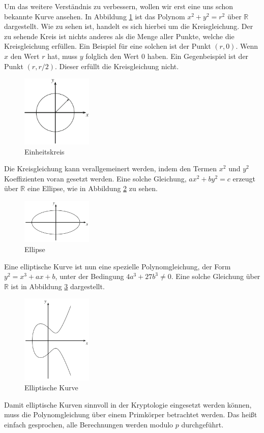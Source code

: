 Um das weitere Verständnis zu verbessern, wollen wir erst eine uns schon bekannte Kurve ansehen. In Abbildung \ref{fig:Einheitskreis} ist das Polynom $x^2 + y^2 = r^2$ über $\mathbb{R}$ dargestellt. Wie zu sehen ist, handelt es sich hierbei um die Kreisgleichung. Der zu sehende Kreis ist nichts anderes als die Menge aller Punkte, welche die Kreisgleichung erfüllen.
Ein Beispiel für eine solchen ist der Punkt $(r,0)$. Wenn $x$ den Wert $r$ hat, muss $y$ folglich den Wert $0$ haben. Ein Gegenbeispiel ist der Punkt $(r,r/2)$. Dieser erfüllt die Kreisgleichung nicht.
\begin{figure}[!h]
    \centering
    \includegraphics[width=0.3\textwidth]{grafiken/Kreis.PNG}
    \caption{Einheitskreis}
    \label{fig:Einheitskreis}
\end{figure}
Die Kreisgleichung kann verallgemeinert werden, indem den Termen $x^2$ und $y^2$ Koeffizienten voran gesetzt werden. Eine solche Gleichung, $ax^2 + by^2 = c$ erzeugt über $\mathbb{R}$ eine Ellipse, wie in Abbildung \ref{fig:Ellipse} zu sehen.
\begin{figure}[H]
    \centering
    \includegraphics[width=0.3\textwidth]{grafiken/Ellipse.PNG}
    \caption{Ellipse}
    \label{fig:Ellipse}
\end{figure}
Eine elliptische Kurve ist nun eine spezielle Polynomgleichung, der Form $y^2 = x^3 + ax + b$, unter der Bedingung $4a^3 + 27b^3 \neq 0$. Eine solche Gleichung über $\mathbb{R}$ ist in Abbildung \ref{fig:Elliptische_Kurve} dargestellt.
\begin{figure}[!h]
    \centering
    \includegraphics[width=0.3\textwidth]{grafiken/Elliptische_Kurve.PNG}
    \caption{Elliptische Kurve}
    \label{fig:Elliptische_Kurve}
\end{figure}
Damit elliptische Kurven sinnvoll in der Kryptologie eingesetzt werden können, muss die Polynomgleichung über einem Primkörper betrachtet werden. Das heißt einfach gesprochen, alle Berechnungen werden modulo $p$ durchgeführt.
